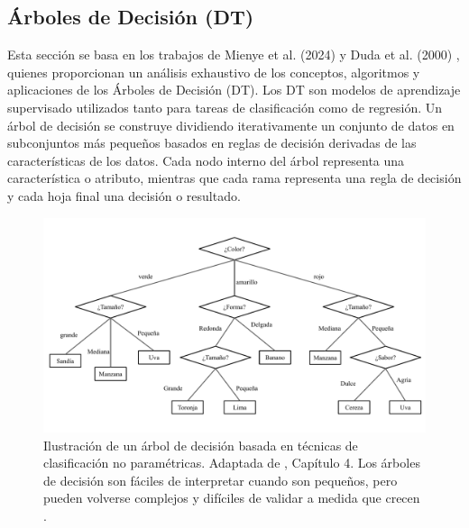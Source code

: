 \subsection{Árboles de Decisión (DT)}

Esta sección se basa en los trabajos de Mienye et al. (2024) \cite{mienye2024survey} y Duda et al. (2000) \cite{duda-2000}, quienes proporcionan un análisis exhaustivo de los conceptos, algoritmos y aplicaciones de los Árboles de Decisión (DT). Los DT son modelos de aprendizaje supervisado utilizados tanto para tareas de clasificación como de regresión. Un árbol de decisión se construye dividiendo iterativamente un conjunto de datos en subconjuntos más pequeños basados en reglas de decisión derivadas de las características de los datos. Cada nodo interno del árbol representa una característica o atributo, mientras que cada rama representa una regla de decisión y cada hoja final una decisión o resultado.

\begin{figure}[H]
    \centering
    \includegraphics[width=\textwidth]{include/arbol decision.pdf}
    \caption{Ilustración de un árbol de decisión basada en técnicas de clasificación no paramétricas. Adaptada de \cite{duda-2000}, Capítulo 4. Los árboles de decisión son fáciles de interpretar cuando son pequeños, pero pueden volverse complejos y difíciles de validar a medida que crecen \cite{Liu-2015}. }
    \label{fig:decision-tree}
\end{figure}

